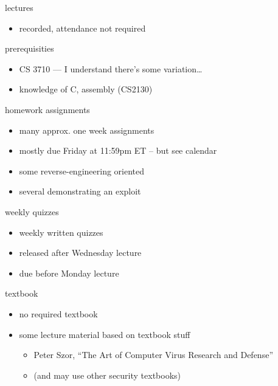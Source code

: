 \begin{frame}{lectures}
    \begin{itemize}
    \item recorded, attendance not required
    \end{itemize}
\end{frame}

\begin{frame}{prerequisities}
    \begin{itemize}
    \item CS 3710 --- I understand there's some variation\ldots
    \item knowledge of C, assembly (CS2130)
    \end{itemize}
\end{frame}

\begin{frame}{homework assignments}
\begin{itemize}
    \item many approx. one week assignments
    \item mostly due Friday at 11:59pm ET -- but see calendar
    \vspace{.5cm}
    \item some reverse-engineering oriented
    \item several demonstrating an exploit
\end{itemize}
\end{frame}

\begin{frame}{weekly quizzes}
\begin{itemize}
    \item weekly written quizzes
    \item released after Wednesday lecture
    \item due before Monday lecture
\end{itemize}
\end{frame}

\begin{frame}{textbook}
\begin{itemize}
    \item no required textbook
    \vspace{.5cm}
    \item some lecture material based on textbook stuff
        \begin{itemize}
        \item Peter Szor, ``The Art of Computer Virus Research and Defense''
        \item (and may use other security textbooks)
        \end{itemize}
    \end{itemize}
\end{frame}

